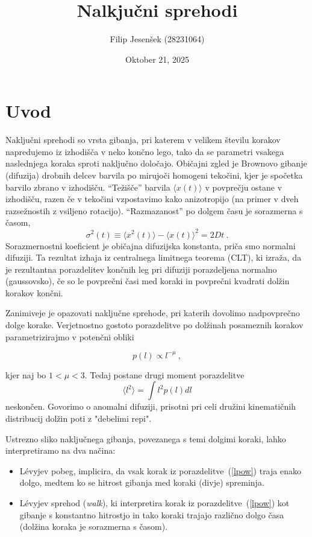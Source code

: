 \documentclass{article}
\title{Nalkjučni sprehodi}
\author{Filip Jesenšek (28231064)}
\date{Oktober 21, 2025}
\begin{document}
\maketitle

\section{Uvod}
Naključni sprehodi so vrsta gibanja, pri katerem
v velikem številu korakov napredujemo iz izhodišča
v neko končno lego, tako da se parametri vsakega naslednjega
koraka sproti naključno določajo.  Običajni zgled
je Brownovo gibanje (difuzija) drobnih delcev barvila
po mirujoči homogeni tekočini, kjer je spočetka barvilo
zbrano v izhodišču.  ``Težišče'' barvila
$\langle x(t)\rangle$ v povprečju ostane v izhodišču,
razen če v tekočini vzpostavimo kako anizotropijo (na primer
v dveh razsežnostih z vsiljeno rotacijo).  ``Razmazanost''
po dolgem času je sorazmerna s časom,
\begin{equation*}
  \sigma^2(t) \equiv \langle x^2(t)\rangle - \langle x(t)\rangle^2 = 2 D t \>.
\end{equation*}
Sorazmernostni koeficient je običajna difuzijska konstanta,
priča smo normalni difuziji.  Ta rezultat izhaja iz
centralnega limitnega teorema (CLT), ki izraža,
da je rezultantna porazdelitev končnih leg pri difuziji
porazdeljena normalno (gaussovsko), če so le povprečni časi
med koraki in povprečni kvadrati dolžin korakov končni.

Zanimiveje je opazovati naključne sprehode, pri katerih dovolimo
nadpovprečno dolge korake.  Verjetnostno gostoto porazdelitve
po dolžinah posameznih korakov parametrizirajmo v potenčni obliki

\begin{equation}
p(l) \propto l^{-\mu} \>,
\label{lpow}
\end{equation}

kjer naj bo $1 < \mu < 3$.  Tedaj postane drugi moment porazdelitve
\begin{equation*}
  \langle l^2\rangle = \int l^2 p(l) d l
\end{equation*}
neskončen.  Govorimo o anomalni difuziji, prisotni pri celi dru\v zini
kinematičnih distribucij dolžin poti z "debelimi repi".

Ustrezno sliko naključnega gibanja, povezanega s temi dolgimi koraki, lahko
interpretiramo na dva načina:
\begin{itemize}
  \item L\'evyjev pobeg, implicira, da vsak korak iz
  porazdelitve~(\ref{lpow}) traja enako dolgo, medtem ko se hitrost gibanja med koraki (divje) spreminja.
  \item L\'evyjev sprehod ({\sl walk\/}), ki interpretira korak iz porazdelitve~(\ref{lpow}) kot  gibanje s konstantno hitrostjo in
  tako koraki trajajo različno dolgo časa (dolžina koraka je sorazmerna s časom).
\end{itemize}
\end{document}
